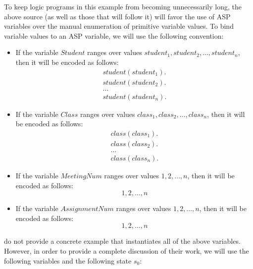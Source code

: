 To keep logic programs in this example from becoming unnecessarily long, the above source (as well as those that will follow it) will favor the use of ASP variables over the manual enumeration of primitive variable values.
To bind variable values to an ASP variable, we will use the following convention:
\begin{itemize}
    \item If the variable $Student$ ranges over values $student_1, student_2, \dots, student_n$, then it will be encoded as follows:
        \begin{gather}
            student(student_1). \\
            student(student_2). \\
            \dots \\
            student(student_n).
        \end{gather}
    \item If the variable $Class$ ranges over values $class_1, class_2, \dots, class_n$, then it will be encoded as follows:
        \begin{gather}
            class(class_1). \\
            class(class_2). \\
            \dots \\
            class(class_n).
        \end{gather}
    \item If the variable $MeetingNum$ ranges over values $1, 2, \dots, n$, then it will be encoded as follows:
        \begin{equation}
            1, 2, \dots, n
        \end{equation}
    \item If the variable $AssignmentNum$ ranges over values $1, 2, \dots, n$, then it will be encoded as follows:
        \begin{equation}
            1, 2, \dots, n
        \end{equation}
\end{itemize}

\citet{gelfond_authorization_2008} do not provide a concrete example that instantiates all of the above variables.
However, in order to provide a complete discussion of their work, we will use the following variables and the following state $s_0$:



